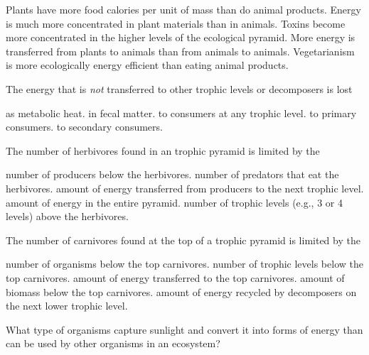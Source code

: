 \begin{choices}
\choice Plants have more food calories per unit of mass than do animal products. %
\choice Energy is much more concentrated in plant materials than in animals. %
\choice Toxins become more concentrated in the higher levels of the ecological pyramid. %
\choice More energy is transferred from plants to animals than from animals to animals. %
\correctchoice Vegetarianism is more ecologically energy efficient than eating animal products. %
\end{choices}

\question
The energy that is \textit{not} transferred to other trophic levels or decomposers is lost

\begin{choices}
\correctchoice as metabolic heat.%
\choice in fecal matter.%
\choice to consumers at any trophic level.%
\choice to primary consumers.%
\choice to secondary consumers.%
\end{choices}


\question
The number of herbivores found in an trophic pyramid is limited by the

\begin{choices}
\choice number of producers below the herbivores.%
\choice number of predators that eat the herbivores.%
\correctchoice amount of energy transferred from producers to the next trophic level.%
\choice amount of energy in the entire pyramid.%
\choice number of trophic levels (e.g., 3 or 4 levels) above the herbivores.%
\end{choices}


\question
The number of carnivores found at the top of a trophic pyramid is limited by the

\begin{choices}
\choice number of organisms below the top carnivores. %
\choice number of trophic levels below the top carnivores. %
\correctchoice amount of energy transferred to the top carnivores. %
\choice amount of biomass below the top carnivores. %
\choice amount of energy recycled by decomposers on the next lower trophic level. %
\end{choices}

\question
What type of organisms capture sunlight and convert it into forms of energy than can be used by other organisms in an ecosystem?

